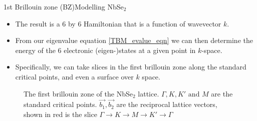 \documentclass[9pt]{beamer}
\begin{document}
\begin{frame}{1st Brillouin zone (BZ)}{Modelling NbSe$_2$}
  \begin{itemize}
    \item The result is a 6 by 6 Hamiltonian that is a function of wavevector $k$.

    \item From our eigenvalue equation \eqref{TBM_evalue_eqn} we can then determine the energy of the 6 electronic (eigen-)states at a given point in $k$-space.

    \item Specifically, we can take slices in the first brillouin zone along the standard critical points, and even a surface over $k$ space.
  \end{itemize}

  \begin{figure}
    \centering
    \caption{The first brillouin zone of the NbSe$_2$ lattice. $\Gamma, K, K' \text{ and } M$ are the standard critical points. $\vec{b_1}, \vec{b_2}$ are the reciprocal lattice vectors, shown in red is the slice $\Gamma \rightarrow K \rightarrow M \rightarrow K' \rightarrow \Gamma$}
  \end{figure}
\end{frame}
\end{document}
